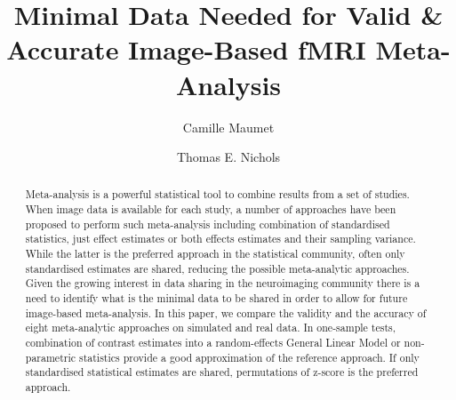 \documentclass{llncs}
\begin{document}
%
\frontmatter          %
%
\pagestyle{headings}  %
%
%
\mainmatter              %
%
\title{Minimal Data Needed for Valid \& Accurate Image-Based fMRI Meta-Analysis}

%
%
\author{Camille Maumet \and Thomas E. Nichols}
%
%
%


\maketitle              %

\begin{abstract}
Meta-analysis is a powerful statistical tool to combine results from a set of studies. When image data is available for each study, a number of approaches have been proposed to perform such meta-analysis including combination of standardised statistics, just effect estimates or both effects estimates and their sampling variance. While the latter is the preferred approach in the statistical community, often only standardised estimates are shared, reducing the possible meta-analytic approaches. Given the growing interest in data sharing in the neuroimaging community there is a need to identify what is the minimal data to be shared in order to allow for future image-based meta-analysis. In this paper, we compare the validity and the accuracy of eight meta-analytic approaches on simulated and real data. In one-sample tests, combination of contrast estimates into a random-effects General Linear Model or non-parametric statistics provide a good approximation of the reference approach. If only standardised statistical estimates are shared, permutations of z-score is the preferred approach.
\end{abstract}
%
\end{document}
